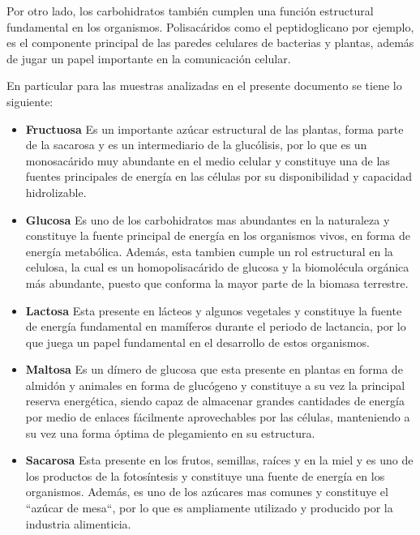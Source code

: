 \documentclass[fleqn,10pt]{SelfArx}
\begin{document}
	Por otro lado, los carbohidratos también cumplen una función estructural fundamental en los organismos. Polisacáridos como el peptidoglicano por ejemplo, es el componente principal de las paredes celulares de bacterias y plantas, además de jugar un papel importante en la comunicación celular.
	
	En particular para las muestras analizadas en el presente documento se tiene lo siguiente:
	\begin{itemize}
		\item \textbf{Fructuosa} Es un importante azúcar estructural de las plantas, forma parte de la sacarosa y es un intermediario de la glucólisis, por lo que es un monosacárido muy abundante en el medio celular y constituye una de las fuentes principales de energía en las células por su disponibilidad y capacidad hidrolizable.
		
		\item \textbf{Glucosa} Es uno de los carbohidratos mas abundantes en la naturaleza y constituye la fuente principal de energía en los organismos vivos, en forma de energía metabólica. Además, esta tambien cumple un rol estructural en la celulosa, la cual es un homopolisacárido de glucosa y la biomolécula orgánica más abundante, puesto que conforma la mayor parte de la biomasa terrestre.
		
		\item \textbf{Lactosa} Esta presente en lácteos y algunos vegetales y constituye la fuente de energía fundamental en mamíferos durante el periodo de lactancia, por lo que juega un papel fundamental en el desarrollo de estos organismos.
		
		\item \textbf{Maltosa} Es un dímero de glucosa que esta presente en plantas en forma de almidón y animales en forma de glucógeno y constituye a su vez la principal reserva energética, siendo capaz de almacenar grandes cantidades de energía por medio de enlaces fácilmente aprovechables por las células, manteniendo a su vez una forma óptima de plegamiento en su estructura.
		
		\item \textbf{Sacarosa} Esta presente en los frutos, semillas, raíces y en la miel y es uno de los productos de la fotosíntesis y constituye una fuente de energía en los organismos. Además, es uno de los azúcares mas comunes y constituye el “azúcar de mesa“, por lo que es ampliamente utilizado y producido por la industria alimenticia.
	\end{itemize}
	
\end{document}
